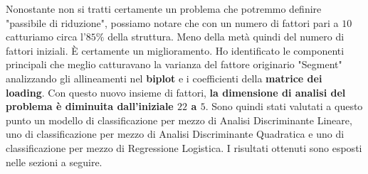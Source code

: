 \documentclass[11pt,a4paper]{article}
\begin{document}
\noindent Nonostante non si tratti certamente un problema che potremmo definire
"passibile di riduzione", possiamo notare che con un numero di fattori pari a
$10$ catturiamo circa l'$85\%$ della struttura. Meno della met\`a quindi del
numero di fattori iniziali. \`E certamente un miglioramento. Ho identificato le
componenti principali che meglio catturavano la varianza del fattore originario
"Segment" analizzando gli allineamenti nel \textbf{biplot} e i coefficienti
della \textbf{matrice dei loading}. Con questo nuovo insieme di fattori,
\textbf{la dimensione di analisi del problema \`e diminuita dall'iniziale $22$ a
$5$}. Sono quindi stati valutati a questo punto un modello di classificazione
per mezzo di Analisi Discriminante Lineare, uno di classificazione per mezzo di
Analisi Discriminante Quadratica e uno di classificazione per mezzo di
Regressione Logistica. I risultati ottenuti sono esposti nelle sezioni a
seguire.
\end{document}

